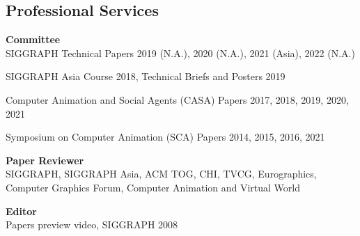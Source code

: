 \documentclass[margin,line]{res}
\begin{document}
\begin{resume}

\section{\sc Professional Services}
{\bf Committee} \\
SIGGRAPH Technical Papers 2019 (N.A.), 2020 (N.A.), 2021 (Asia), 2022 (N.A.)

\vspace*{-.15in}
SIGGRAPH Asia Course 2018, Technical Briefs and Posters 2019 

\vspace*{-.17in}
Computer Animation and Social Agents (CASA) Papers 2017, 2018, 2019, 2020, 2021

\vspace*{-.17in}
Symposium on Computer Animation (SCA) Papers 2014, 2015, 2016, 2021

\vspace*{-.1in}
{\bf Paper Reviewer} \\
SIGGRAPH, SIGGRAPH Asia, ACM TOG, CHI, TVCG, Eurographics, Computer Graphics Forum, Computer Animation and Virtual World


\vspace*{-.1in}
{\bf Editor} \\
Papers preview video, SIGGRAPH 2008



\end{resume}
\end{document}
